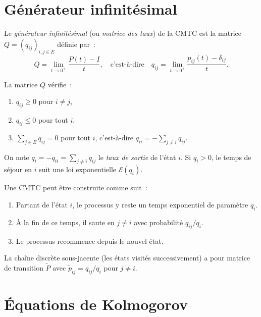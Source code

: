\section{G\'en\'erateur infinit\'esimal}

\begin{definition}
Le \emph{g\'en\'erateur infinit\'esimal} (ou \emph{matrice des taux}) de la CMTC est
la matrice $Q = (q_{ij})_{i,j \in E}$ d\'efinie par~:
\[
  Q = \lim_{t \to 0^+} \frac{P(t) - I}{t}, \quad \text{c'est-\`a-dire} \quad
  q_{ij} = \lim_{t \to 0^+} \frac{p_{ij}(t) - \delta_{ij}}{t}.
\]
\end{definition}

\begin{proposition}[Propri\'et\'es de $Q$]
La matrice $Q$ v\'erifie~:
\begin{enumerate}
  \item $q_{ij} \geq 0$ pour $i \neq j$,
  \item $q_{ii} \leq 0$ pour tout $i$,
  \item $\sum_{j \in E} q_{ij} = 0$ pour tout $i$, c'est-\`a-dire $q_{ii} = -\sum_{j \neq i} q_{ij}$.
\end{enumerate}
On note $q_i = -q_{ii} = \sum_{j \neq i} q_{ij}$ le \emph{taux de sortie} de l'\'etat $i$.
Si $q_i > 0$, le temps de s\'ejour en $i$ suit une loi exponentielle
$\mathcal{E}(q_i)$.
\end{proposition}

\begin{intuition}[title=\textbf{Construction par temps de s\'ejour}]
Une CMTC peut \^etre construite comme suit~:
\begin{enumerate}
  \item Partant de l'\'etat $i$, le processus y reste un temps exponentiel de
    param\`etre $q_i$.
  \item \`A la fin de ce temps, il saute en $j \neq i$ avec probabilit\'e
    $q_{ij}/q_i$.
  \item Le processus recommence depuis le nouvel \'etat.
\end{enumerate}
La cha\^ine discr\`ete sous-jacente (les \'etats visit\'es successivement) a pour
matrice de transition $\tilde{P}$ avec $\tilde{p}_{ij} = q_{ij}/q_i$ pour $j \neq i$.
\end{intuition}

\section{\'Equations de Kolmogorov}

